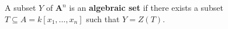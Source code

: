 A subset $Y$ of $\mathbf{A}^n$ is an \textbf{algebraic set} if there exists a subset $T \subseteq A = k[x_1, \ldots, x_n]$ such that $Y = Z(T)$.
